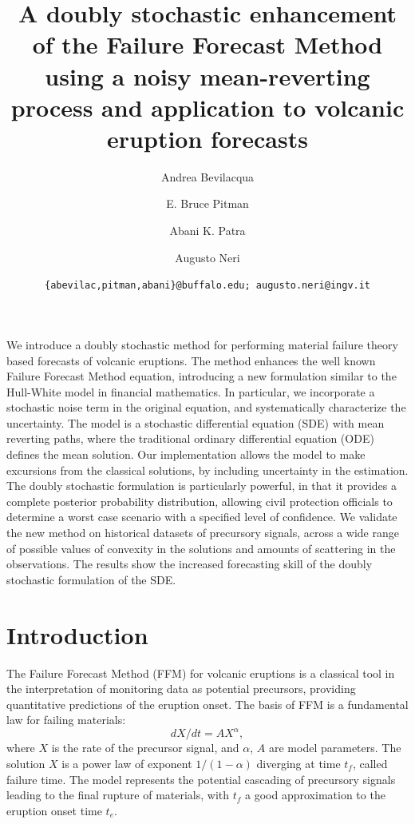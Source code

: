 \documentclass{article}
\begin{document}
\title{\bf A doubly stochastic enhancement of the Failure Forecast Method using a noisy mean-reverting process and application to volcanic eruption forecasts}
\author[1]{Andrea Bevilacqua}
\author[2]{E. Bruce Pitman}
\author[3,4]{Abani K. Patra}
\author[5]{Augusto Neri}


\date{\texttt{\{abevilac,pitman,abani\}@buffalo.edu; augusto.neri@ingv.it}}


\maketitle
\abstract
We introduce a doubly stochastic method for performing material failure theory based forecasts of volcanic eruptions. The method enhances the well known Failure Forecast Method equation, introducing a new formulation similar to the Hull-White model in financial mathematics. In particular, we incorporate a stochastic noise term in the original equation, and systematically characterize the uncertainty. The model is a stochastic differential equation (SDE) with mean reverting paths, where the traditional ordinary differential equation (ODE) defines the mean solution. Our implementation allows the model to make excursions from the classical solutions, by including uncertainty in the estimation. The doubly stochastic formulation is particularly powerful, in that it provides a complete posterior probability distribution, allowing civil protection officials to determine a worst case scenario with a specified level of confidence. We validate the new method on historical datasets of precursory signals, across a wide range of possible values of convexity in the solutions and amounts of scattering in the observations. The results show the increased forecasting skill of the doubly stochastic formulation of the SDE.

\tableofcontents

\section{Introduction}
The Failure Forecast Method (FFM) for volcanic eruptions is a classical tool in the interpretation of monitoring data as potential precursors, providing quantitative predictions of the eruption onset. The basis of FFM is a fundamental law for failing materials:
$$dX/dt=AX^\alpha,$$
where $X$ is the rate of the precursor signal, and $\alpha$, $A$ are model parameters. The solution $X$ is a power law of exponent $1/(1-\alpha)$ diverging at time $t_f$, called failure time. The model represents the potential cascading of precursory signals leading to the final rupture of materials, with $t_f$ a good approximation to the eruption onset time $t_e$.
\end{document}
